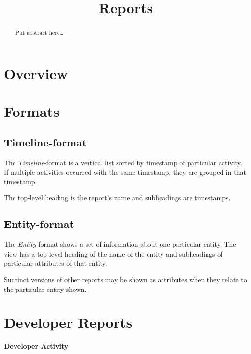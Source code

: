 \documentclass{article}
\title{Reports}
\begin{document}
\maketitle

\tableofcontents

\begin{abstract}
Put abstract here\ldots
\end{abstract}





\section{Overview}


\section{Formats}

\subsection{Timeline-format}

The \textit{Timeline}-format is a vertical list sorted by timestamp of
particular activity. If multiple activities occurred with the same timestamp,
they are grouped in that timestamp.

The top-level heading is the report's name and subheadings are timestamps.


\subsection{Entity-format}

The \textit{Entity}-format shows a set of information about one particular
entity. The view has a top-level heading of the name of the entity and
subheadings of particular attributes of that entity.

Succinct versions of other reports may be shown as attributes when they relate
to the particular entity shown.



\section{Developer Reports}

\paragraph{Developer Activity}
\end{document}
